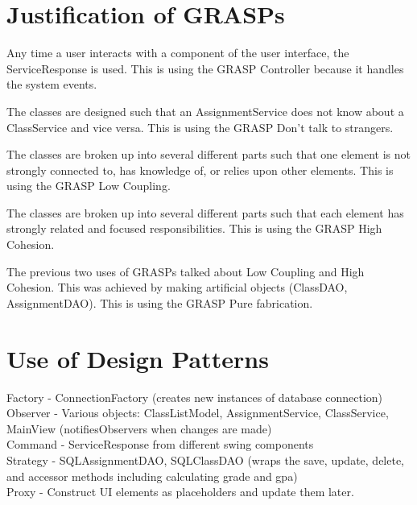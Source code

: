 \documentclass[12pt]{article}
\begin{document}
\newpage

\section*{Justification of GRASPs}

\noindent
Any time a user interacts with a component of the user interface, the ServiceResponse is used. This is using the GRASP Controller because it handles the system events.

\noindent
The classes are designed such that an AssignmentService does not know about a ClassService and vice versa. This is using the GRASP Don't talk to strangers.

\noindent
The classes are broken up into several different parts such that one element is not strongly connected to, has knowledge of, or relies upon other elements. This is using the GRASP Low Coupling.

\noindent
The classes are broken up into several different parts such that each element has strongly related and focused responsibilities. This is using the GRASP High Cohesion.

\noindent
The previous two uses of GRASPs talked about Low Coupling and High Cohesion. This was achieved by making artificial objects (ClassDAO, AssignmentDAO). This is using the GRASP Pure fabrication.

\newpage

\section*{Use of Design Patterns}

\noindent
Factory - ConnectionFactory (creates new instances of database connection) \\

\noindent
Observer - Various objects: ClassListModel, AssignmentService, ClassService, MainView (notifiesObservers when changes are made)\\

\noindent
Command - ServiceResponse from different swing components \\

\noindent
Strategy - SQLAssignmentDAO, SQLClassDAO (wraps the save, update, delete, and accessor methods including calculating grade and gpa) \\

\noindent
Proxy - Construct UI elements as placeholders and update them later. \\
\end{document}
